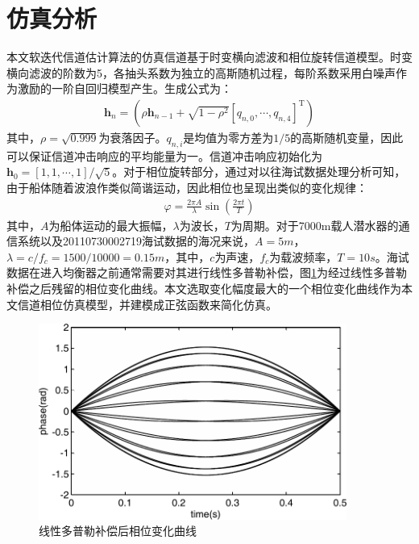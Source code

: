 \section{仿真分析}
本文软迭代信道估计算法的仿真信道基于时变横向滤波和相位旋转信道模型。时变横向滤波的阶数为5，各抽头系数为独立的高斯随机过程，每阶系数采用白噪声作为激励的一阶自回归模型产生。生成公式为：
\begin{eqnarray}
    \mathbf{h}_n=(\rho\mathbf{h}_{n-1}+\sqrt{1-\rho^2}[q_{n,0},\cdots,q_{n,4}]^{\mathrm{T}})
    \label{equ:4.29}
\end{eqnarray}
其中，$\rho=\sqrt{0.999}$为衰落因子。$q_{n,i}$是均值为零方差为$1/5$的高斯随机变量，因此可以保证信道冲击响应的平均能量为一。信道冲击响应初始化为$\mathbf{h}_{0}=[1,1,\cdots,1]/\sqrt{5}$。对于相位旋转部分，通过对以往海试数据处理分析可知，由于船体随着波浪作类似简谐运动，因此相位也呈现出类似的变化规律：
\begin{eqnarray}
    \varphi=\frac{2\pi A}{\lambda}\sin(\frac{2\pi t}{T})
    \label{equ:4.30}
\end{eqnarray}
其中，$A$为船体运动的最大振幅，$\lambda$为波长，$T$为周期。对于7000m载人潜水器的通信系统以及20110730002719海试数据的海况来说，$A=5m$，$\lambda=c/f_c=1500/10000=0.15m$，其中，$c$为声速，$f_c$为载波频率，$T=10s$。海试数据在进入均衡器之前通常需要对其进行线性多普勒补偿，图\ref{fig:4.3}为经过线性多普勒补偿之后残留的相位变化曲线。本文选取变化幅度最大的一个相位变化曲线作为本文信道相位仿真模型，并建模成正弦函数来简化仿真。
\begin{figure}[htb]
  \begin{center}
    \includegraphics[width=0.9\textwidth]{images/phase_diff.pdf}
  \end{center}
  \caption{线性多普勒补偿后相位变化曲线}
  \label{fig:4.3}
\end{figure}

